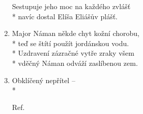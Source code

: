 \begin{enumerate}
	Sestupuje jeho moc na každého zvlášť\\*
	navíc dostal Elíša Eliášův plášť. 
\item Major Náman někde chyt kožní chorobu, \\*
	teď se štítí použít jordánskou vodu. \\*
	Uzdravení zázračné vytře zraky všem \\*
	vděčný Náman odváží zaslíbenou zem.
\item Obklíčený nepřítel -- \\*
\item[Ref.]	
\end{enumerate}
